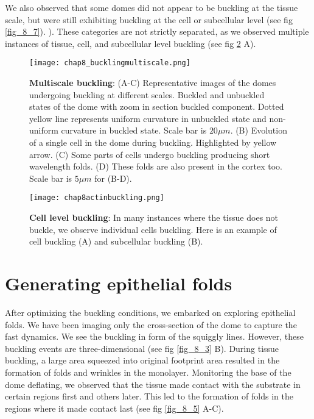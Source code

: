 We also observed that some domes did not appear to be buckling at the tissue scale, but were still exhibiting buckling at the cell or subcellular level (see fig \ref{fig_8_7}). ). These categories are not strictly separated, as we observed multiple instances of tissue, cell, and subcellular level buckling  (see fig \ref{fig_8_6} A).

\begin{figure}
	\centering
	\texttt{[image: chap8\_bucklingmultiscale.png]}
	\caption{\label{fig_8_4} \textbf{Multiscale buckling}: (A-C) Representative images of the domes undergoing buckling at different scales. Buckled and unbuckled states of the dome with zoom in section buckled component. Dotted yellow line represents uniform curvature in unbuckled state and non-uniform curvature in buckled state. Scale bar is $20 \mu m$. (B) Evolution of a single cell in the dome during buckling. Highlighted by yellow arrow. (C) Some parts of cells undergo buckling producing short wavelength folds. (D) These  folds are also present in the cortex too. Scale bar is $5 \mu m$ for (B-D).
	}
\end{figure}

\begin{figure}[]
	\centering
	\texttt{[image: chap8actinbuckling.png]}
	\caption{\label{fig_8_6} \textbf{Cell level buckling}: In many instances where the tissue does not buckle, we observe individual cells buckling. Here is an example of cell buckling (A) and subcellular buckling (B).}
\end{figure}

\hypertarget{generating-epithelial-folds}{%
	\section{Generating epithelial
		folds}\label{generating-epithelial-folds}}

After optimizing the buckling conditions, we embarked on exploring epithelial folds. We have been imaging only the cross-section of the dome to capture the fast dynamics. We see the buckling in form of the squiggly lines. However, these buckling events are three-dimensional (see fig \ref{fig_8_3} B). During tissue buckling, a large area squeezed into original footprint area resulted in the formation of folds and wrinkles in the monolayer. Monitoring the base of the dome deflating, we observed that the tissue made contact with the substrate in certain regions first and others later. This led to the formation of folds in the regions where it made contact last (see fig \ref{fig_8_5} A-C).


